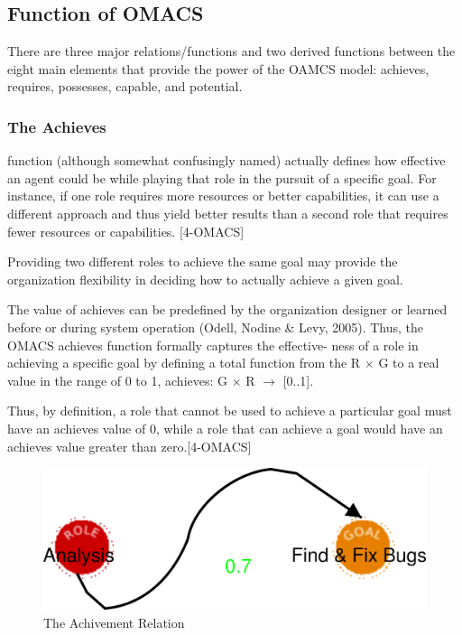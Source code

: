 
 
\subsection{ Function of OMACS }

There are three major relations/functions and two derived functions between the eight main elements that provide the power of the OAMCS model: achieves, requires, possesses, capable, and potential. 
\subsubsection{The Achieves}
function (although somewhat confusingly named) actually defines how effective an agent could be while playing that role in the pursuit of a specific goal. For instance, if one role requires more resources or better capabilities, it can use a different approach and thus yield better results than a second role that requires fewer resources or capabilities. [4-OMACS]

 Providing two different roles to achieve the same goal  may provide the organization flexibility in deciding how to actually achieve a given goal.

 The value of achieves can be predefined by the organization designer or learned before or during system operation (Odell, Nodine \& Levy, 2005). Thus, the OMACS achieves function formally captures the effective- ness of a role in achieving a specific goal by defining a total function from the R $\times$ G to a real value in the range of 0 to 1, achieves: G $\times$ R $\rightarrow$ {[}0..1{]}.
 
  Thus, by definition, a role that cannot be used to achieve a particular goal must have an achieves value of 0, while a role that can achieve a goal would have an achieves value greater than zero.[4-OMACS]

\begin{figure}[th]
	\centering
		\includegraphics{chapiter1/img/a}
	\caption{\label{fig:The Achivement Relation}The Achivement Relation }
\end{figure}
 

